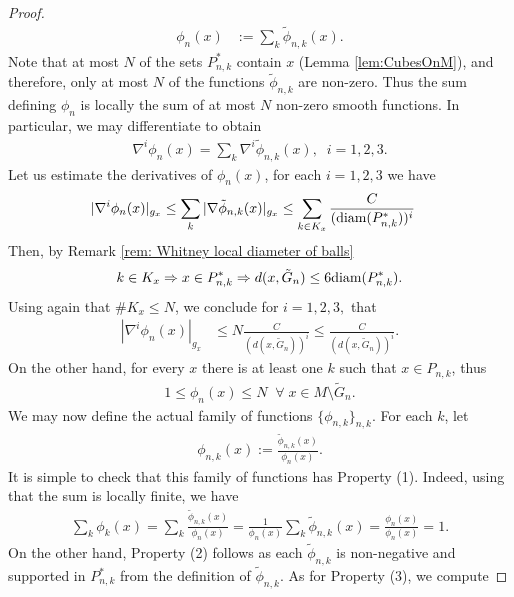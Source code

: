 \documentclass[11pt,reqno]{amsart}
\numberwithin{equation}{section}
\theoremstyle{plain}
\def\diam{\textnormal{diam}}
\begin{document}
\begin{proof}
\begin{align*}
      \phi_n(x) & := \sum\limits_{k}\tilde \phi_{n,k}(x).
    \end{align*}
    Note that at most $N$ of the sets $P_{n,k}^*$ contain $x$ (Lemma \ref{lem:CubesOnM}), and therefore, only at most $N$ of the functions $\tilde \phi_{n,k}$ are non-zero. Thus the sum defining $\phi_n$ is locally the sum of at most $N$ non-zero smooth functions.  In particular, we may differentiate to obtain
    \begin{align*}	
      \nabla^{i} \phi_n(x)  = \sum \limits_{k}\nabla^{i} \tilde \phi_{n,k}(x),\;\;i=1,2,3.
    \end{align*}
    Let us estimate the derivatives of $\phi_n(x)$, for each $i=1,2,3$ we have
    \begin{align*}
      |\nabla^i \phi_n(x)|_{g_x} & \leq \sum \limits_{k}|\nabla \tilde \phi_{n,k}(x)|_{g_x} \leq \sum \limits_{k\in K_x}\frac{C}{(\diam(P_{n,k}^*))^i}
    \end{align*}
    Then, by Remark \ref{rem: Whitney local diameter of balls}
    \begin{align*}	
      k\in K_x \Rightarrow x \in P_{n,k}^* \Rightarrow d(x,\tilde G_n) \leq 6\diam(P_{n,k}^*).	
    \end{align*} 
    Using again that $\#K_x\leq N$, we conclude for $i=1,2,3,$ that		
    \begin{align*}
      |\nabla^i \phi_n(x)|_{g_x} & \leq  N\frac{C}{(d(x,\tilde G_n))^i}\leq \frac{C}{(d(x,\tilde G_n))^i}.
    \end{align*}	
    On the other hand,  for every $x$ there is at least one $k$ such that $x \in P_{n,k}$, thus
    \begin{align*}
      1\leq \phi_n(x) \leq N\;\;\forall\;x \in M\setminus \tilde G_n.
    \end{align*}	
    We may now define the actual family of functions $\{\phi_{n,k}\}_{n,k}$. For each $k$, let
    \begin{align*} 
      \phi_{n,k}(x) := \frac{\tilde \phi_{n,k}(x)}{\phi_n(x)}.
    \end{align*}
    It is simple to check that this family of functions has Property (1). Indeed, using that the sum is locally finite, we have
    \begin{align*}	
      \sum \limits_{k}\phi_{k}(x)= \sum \limits_{k} \frac{\tilde \phi_{n,k}(x)}{\phi_n(x)} = \frac{1}{\phi_n(x)}\sum \limits_{k} \tilde \phi_{n,k}(x) = \frac{\phi_n(x)}{\phi_n(x)} = 1.
    \end{align*}	
    On the other hand, Property (2) follows as each $\tilde \phi_{n,k}$ is non-negative and supported in $P_{n,k}^*$ from the definition of $\tilde \phi_{n,k}$. As for Property (3), we compute

\end{proof}
\end{document}
